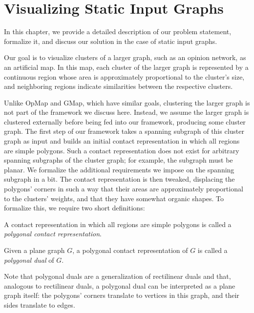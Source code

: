 \chapter{Visualizing Static Input Graphs}
\label{chap:visualizing-static-input-graphs}

In this chapter, we provide a detailed description of our problem statement, formalize it, and discuss our solution in the case of static input graphs.

Our goal is to visualize clusters of a larger graph, such as an opinion network, as an artificial map.
In this map, each cluster of the larger graph is represented by a continuous region whose area is approximately proportional to the cluster's size, and neighboring regions indicate similarities between the respective clusters.

Unlike OpMap and GMap, which have similar goals, clustering the larger graph is not part of the framework we discuss here.
Instead, we assume the larger graph is clustered externally before being fed into our framework, producing some cluster graph.
The first step of our framework takes a spanning subgraph of this cluster graph as input and builds an initial contact representation in which all regions are simple polygons.
Such a contact representation does not exist for arbitrary spanning subgraphs of the cluster graph; for example, the subgraph must be planar.
We formalize the additional requirements we impose on the spanning subgraph in a bit.
The contact representation is then tweaked, displacing the polygons' corners in such a way that their areas are approximately proportional to the clusters' weights, and that they have somewhat organic shapes.
To formalize this, we require two short definitions:

\begin{definition}
A contact representation in which all regions are simple polygons is called a \emph{polygonal contact representation}.
\end{definition}

\begin{definition}
Given a plane graph $G$, a polygonal contact representation of $G$ is called a \emph{polygonal dual} of $G$.
\end{definition}

Note that polygonal duals are a generalization of rectilinear duals and that, analogous to rectilinear duals, a polygonal dual can be interpreted as a plane graph itself: the polygons' corners translate to vertices in this graph, and their sides translate to edges.

